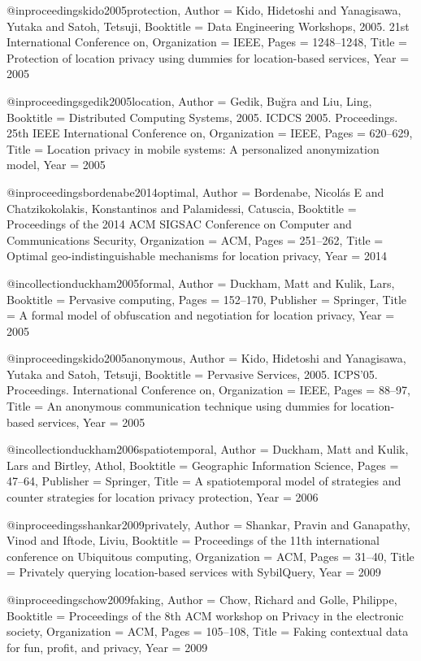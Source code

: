 {{{{{{{	@inproceedings{kido2005protection,
	Author = {Kido, Hidetoshi and Yanagisawa, Yutaka and Satoh, Tetsuji},
	Booktitle = {Data Engineering Workshops, 2005. 21st International Conference on},
	Organization = {IEEE},
	Pages = {1248--1248},
	Title = {Protection of location privacy using dummies for location-based services},
	Year = {2005}}
	
	@inproceedings{gedik2005location,
	Author = {Gedik, Bu{\u{g}}ra and Liu, Ling},
	Booktitle = {Distributed Computing Systems, 2005. ICDCS 2005. Proceedings. 25th IEEE International Conference on},
	Organization = {IEEE},
	Pages = {620--629},
	Title = {Location privacy in mobile systems: A personalized anonymization model},
	Year = {2005}}
	
	@inproceedings{bordenabe2014optimal,
	Author = {Bordenabe, Nicol{\'a}s E and Chatzikokolakis, Konstantinos and Palamidessi, Catuscia},
	Booktitle = {Proceedings of the 2014 ACM SIGSAC Conference on Computer and Communications Security},
	Organization = {ACM},
	Pages = {251--262},
	Title = {Optimal geo-indistinguishable mechanisms for location privacy},
	Year = {2014}}
	
	@incollection{duckham2005formal,
	Author = {Duckham, Matt and Kulik, Lars},
	Booktitle = {Pervasive computing},
	Pages = {152--170},
	Publisher = {Springer},
	Title = {A formal model of obfuscation and negotiation for location privacy},
	Year = {2005}}
	
	@inproceedings{kido2005anonymous,
	Author = {Kido, Hidetoshi and Yanagisawa, Yutaka and Satoh, Tetsuji},
	Booktitle = {Pervasive Services, 2005. ICPS'05. Proceedings. International Conference on},
	Organization = {IEEE},
	Pages = {88--97},
	Title = {An anonymous communication technique using dummies for location-based services},
	Year = {2005}}
	
	@incollection{duckham2006spatiotemporal,
	Author = {Duckham, Matt and Kulik, Lars and Birtley, Athol},
	Booktitle = {Geographic Information Science},
	Pages = {47--64},
	Publisher = {Springer},
	Title = {A spatiotemporal model of strategies and counter strategies for location privacy protection},
	Year = {2006}}
	
	@inproceedings{shankar2009privately,
	Author = {Shankar, Pravin and Ganapathy, Vinod and Iftode, Liviu},
	Booktitle = {Proceedings of the 11th international conference on Ubiquitous computing},
	Organization = {ACM},
	Pages = {31--40},
	Title = {Privately querying location-based services with SybilQuery},
	Year = {2009}}
	
	@inproceedings{chow2009faking,
	Author = {Chow, Richard and Golle, Philippe},
	Booktitle = {Proceedings of the 8th ACM workshop on Privacy in the electronic society},
	Organization = {ACM},
	Pages = {105--108},
	Title = {Faking contextual data for fun, profit, and privacy},
	Year = {2009}}
	
}}}}}}}
